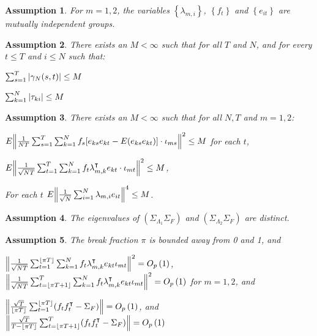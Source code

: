 \documentclass[12pt]{article}
\newtheorem{assump}{Assumption}
\newcommand*{\tran}{\intercal}
\theoremstyle{plain}
\numberwithin{equation}{section}
\begin{document}
\begin{assump}
\label{ass:4_ind_groups}
For $m = 1, 2$, the variables $\left\lbrace \lambda_{m, i} \right\rbrace$, $\left\lbrace f_t \right\rbrace $ and $\left\lbrace e_{it}\right\rbrace $ are  mutually independent groups.
\end{assump}
\begin{assump}
\label{ass:5_error_corr}
There exists an $M \lt \infty$ such that for all $T$ and $N$, and for every $t \leq T$ and $i \leq N$ such that:
\begin{assumpenum}[wide = 0pt, leftmargin = 3em]
\item \label{ass:5_error_corr:1} 
$\sum_{s = 1}^{T} \abs{\gamma_{N}(s, t)} \leq M$ 
\item \label{ass:5_error_corr:2}
$\sum_{k = 1}^{N} \abs{\tau_{ki}} \leq M$
\end{assumpenum}
\end{assump}
\begin{assump}
\label{ass:6_moments}
There exists an $M \lt \infty$ such that for all $N, T$ and $m = 1, 2$:
\begin{assumpenum}
\item \label{ass:6_moments:1} 
$E \norm{\frac{1}{NT} \sum_{s = 1}^{T} \sum_{k = 1}^{N} f_s [e_{ks} e_{kt} - E(e_{ks} e_{kt})] \cdot \iota_{ms} }^2 \leq M$ for each $t$,
\item \label{ass:6_moments:2} 
$E \norm{\frac{1}{\sqrt{NT}} \sumT \sumNk f_t \lambda_{m, k}^\tran e_{kt} \cdot \iota_{mt} }^2 \leq M$,
\item \label{ass:6_moments:3}
For each $t$
$E \norm{\frac{1}{\sqrt{N}} \sum_{i = 1}^{N} \lambda_{m, i} e_{it}}^4 \leq M$.
\end{assumpenum}
\end{assump}
\begin{assump}
\label{ass:7_eigen_distinct}
The eigenvalues of $(\Sigma_{\Lambda_1} \Sigma_F)$ and $(\Sigma_{\Lambda_2} \Sigma_F)$ are distinct.
\end{assump}
\begin{assump}
\label{ass:8_break_fraction}
The break fraction $\pi$ is bounded away from 0 and 1, and
\begin{assumpenum}
\item \label{ass:8_break_fraction:1}
$
\norm{\frac{1}{\sqrt{NT}} \sumTfloor \sumNk f_t \lambda_{m, k}^\tran e_{kt} \iota_{mt}}^2 = \Op{1}$, 
$\norm{\frac{1}{\sqrt{NT}} \sumTfloort \sumNk f_t \lambda_{m, k}^\tran e_{kt} \iota_{mt}}^2 = \Op{1}
$
for $m = 1, 2$, and
\item \label{ass:8_break_fraction:2}
$\norm{\frac{\sqrt{T}}{\floor{\pi T}} \sumTfloor (f_t f_t^\tran - \Sigma_F)} = \Op{1}$, and $\norm{\frac{\sqrt{T}}{T - \floor{\pi T}} \sumTfloort (f_t f_t^\tran - \Sigma_F)} = \Op{1}$
\end{assumpenum}
\end{assump}
\end{document}
